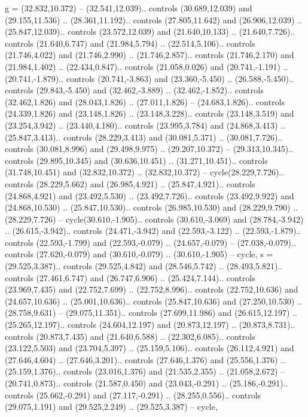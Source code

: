 {g} = {(32.832,10.372) -- (32.541,12.039).. controls (30.689,12.039) and (29.155,11.536) .. (28.361,11.192).. controls (27.805,11.642) and (26.906,12.039) .. (25.847,12.039).. controls (23.572,12.039) and (21.640,10.133) .. (21.640,7.726).. controls (21.640,6.747) and (21.984,5.794) .. (22.514,5.106).. controls (21.746,4.022) and (21.746,2.990) .. (21.746,2.857).. controls (21.746,2.170) and (21.984,1.402) .. (22.434,0.847).. controls (21.058,0.026) and (20.741,-1.191) .. (20.741,-1.879).. controls (20.741,-3.863) and (23.360,-5.450) .. (26.588,-5.450).. controls (29.843,-5.450) and (32.462,-3.889) .. (32.462,-1.852).. controls (32.462,1.826) and (28.043,1.826) .. (27.011,1.826) -- (24.683,1.826).. controls (24.339,1.826) and (23.148,1.826) .. (23.148,3.228).. controls (23.148,3.519) and (23.254,3.942) .. (23.440,4.180).. controls (23.995,3.784) and (24.868,3.413) .. (25.847,3.413).. controls (28.229,3.413) and (30.081,5.371) .. (30.081,7.726).. controls (30.081,8.996) and (29.498,9.975) .. (29.207,10.372) -- (29.313,10.345).. controls (29.895,10.345) and (30.636,10.451) .. (31.271,10.451).. controls (31.748,10.451) and (32.832,10.372) .. (32.832,10.372) -- cycle(28.229,7.726).. controls (28.229,5.662) and (26.985,4.921) .. (25.847,4.921).. controls (24.868,4.921) and (23.492,5.530) .. (23.492,7.726).. controls (23.492,9.922) and (24.868,10.530) .. (25.847,10.530).. controls (26.985,10.530) and (28.229,9.790) .. (28.229,7.726) -- cycle(30.610,-1.905).. controls (30.610,-3.069) and (28.784,-3.942) .. (26.615,-3.942).. controls (24.471,-3.942) and (22.593,-3.122) .. (22.593,-1.879).. controls (22.593,-1.799) and (22.593,-0.079) .. (24.657,-0.079) -- (27.038,-0.079).. controls (27.620,-0.079) and (30.610,-0.079) .. (30.610,-1.905) -- cycle},
{s} = {(29.525,3.387).. controls (29.525,4.842) and (28.546,5.742) .. (28.493,5.821).. controls (27.461,6.747) and (26.747,6.906) .. (25.424,7.144).. controls (23.969,7.435) and (22.752,7.699) .. (22.752,8.996).. controls (22.752,10.636) and (24.657,10.636) .. (25.001,10.636).. controls (25.847,10.636) and (27.250,10.530) .. (28.758,9.631) -- (29.075,11.351).. controls (27.699,11.986) and (26.615,12.197) .. (25.265,12.197).. controls (24.604,12.197) and (20.873,12.197) .. (20.873,8.731).. controls (20.873,7.435) and (21.640,6.588) .. (22.302,6.085).. controls (23.122,5.503) and (23.704,5.397) .. (25.159,5.106).. controls (26.112,4.921) and (27.646,4.604) .. (27.646,3.201).. controls (27.646,1.376) and (25.556,1.376) .. (25.159,1.376).. controls (23.016,1.376) and (21.535,2.355) .. (21.058,2.672) -- (20.741,0.873).. controls (21.587,0.450) and (23.043,-0.291) .. (25.186,-0.291).. controls (25.662,-0.291) and (27.117,-0.291) .. (28.255,0.556).. controls (29.075,1.191) and (29.525,2.249) .. (29.525,3.387) -- cycle},
